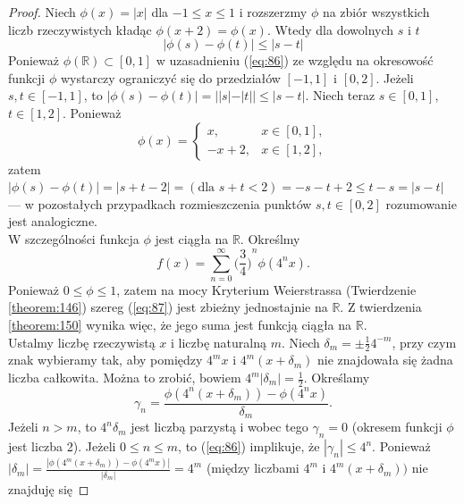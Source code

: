 \documentclass[leqno]{article}
\begin{document}
\begin{justify}
\begin{proof}
    Niech $\phi(x) = |x|$ dla $-1 \leqslant x \leqslant 1$ i rozszerzmy $\phi$ na zbiór wszystkich liczb rzeczywistych
    kładąc $\phi(x+2) = \phi(x)$. Wtedy dla dowolnych $s$ i $t$
    \begin{equation}\label{eq:86}
        |\phi(s) - \phi(t)| \leqslant |s - t|
    \end{equation}
    Ponieważ $\phi(\mathbb{R}) \subset [0,1]$ w uzasadnieniu (\ref{eq:86}) ze względu na okresowość funkcji $\phi$ wystarczy ograniczyć się do
    przedziałów $[-1, 1]$ i $[0, 2]$. Jeżeli $s,t \in [-1,1]$, to $|\phi(s) - \phi(t)| = ||s| - |t|| \leqslant |s - t|$. 
    Niech teraz $s \in [0,1]$, $t \in [1,2]$. Ponieważ 
    \[
        \phi(x) = 
            \begin{cases}
                x, &x \in [0,1], \\
                -x +2, &x \in [1,2],
        \end{cases}
    \]
    zatem $|\phi(s) - \phi(t)| = |s + t - 2| = (\text{dla } s + t < 2) = -s - t + 2 \leqslant t - s = |s - t|$ ---
    w pozostałych przypadkach rozmieszczenia punktów $s, t \in [0,2]$ rozumowanie jest analogiczne. \\
    W szczególności funkcja $\phi$ jest ciągła na $\mathbb{R}$. Określmy
    \begin{equation}\label{eq:87}
        f(x) = \sum\limits_{n=0}^{\infty}{\Big(\frac{3}{4}\Big)}^n \phi(4^n x).
    \end{equation}
    Ponieważ $0 \leqslant \phi \leqslant 1$, zatem na mocy Kryterium Weierstrassa (Twierdzenie \ref{theorem:146}) szereg 
    (\ref{eq:87}) jest zbieżny jednostajnie na $\mathbb{R}$. Z twierdzenia \ref{theorem:150} wynika więc, że jego suma jest funkcją
    ciągła na $\mathbb{R}$. \\
    Ustalmy liczbę rzeczywistą $x$ i liczbę naturalną $m$. Niech $\delta_m = \pm \frac{1}{2}4^{-m}$, przy czym 
    znak wybieramy tak, aby pomiędzy $4^m x$ i $4^m(x + \delta_m)$ nie znajdowała się żadna liczba całkowita. Można to zrobić,
    bowiem $4^m | \delta_m | = \frac{1}{2}$. Określamy
    \[
        \gamma_n = \frac{\phi(4^n(x + \delta_m)) - \phi(4^n x)}{\delta_m}.
    \]
    Jeżeli $n > m$, to $4^n \delta_m$ jest liczbą parzystą i wobec tego $\gamma_n = 0$ (okresem funkcji $\phi$ jest liczba 2).
    Jeżeli $0 \leqslant n \leqslant m$, to (\ref{eq:86}) implikuje, że $|\gamma_n| \leqslant 4^n$. Ponieważ $|\delta_m| = 
    \frac{|\phi(4^m(x + \delta_m)) - \phi(4^m x)|}{|\delta_m|} = 4^m$ (między liczbami $4^m$ i $4^m(x + \delta_m))$ nie znajduję się 

\end{proof}
\end{justify}
\end{document}
